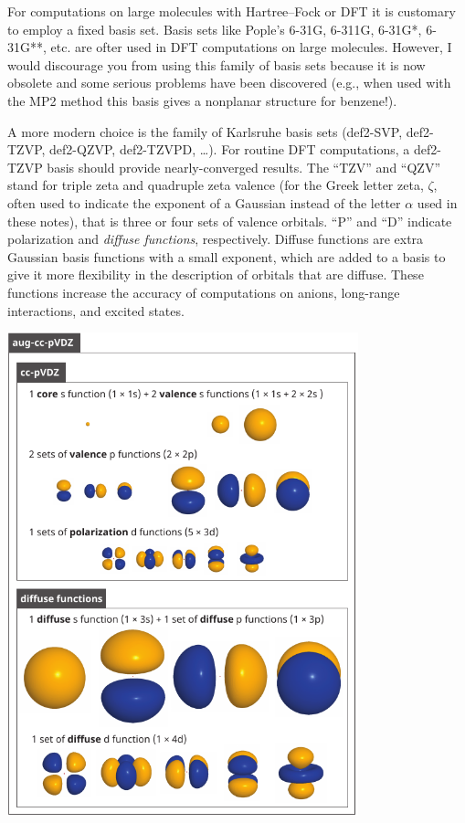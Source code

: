 \documentclass[../Main/chem371-notes.tex]{subfiles}
\begin{document}
For computations on large molecules with Hartree--Fock or DFT it is customary to employ a fixed basis set.
Basis sets like Pople's 6-31G, 6-311G, 6-31G*, 6-31G**, etc. are ofter used in DFT computations on large molecules.
However, I would discourage you from using this family of basis sets because it is now obsolete and some serious problems have been discovered (e.g., when used with the MP2 method this basis gives a nonplanar structure for benzene!).

A more modern choice is the family of Karlsruhe basis sets (def2-SVP, def2-TZVP, def2-QZVP, def2-TZVPD, \ldots). For routine DFT computations, a def2-TZVP basis should provide nearly-converged results.
The ``TZV'' and ``QZV'' stand for triple zeta and quadruple zeta valence (for the Greek letter zeta, $\zeta$, often used to indicate the exponent of a Gaussian instead of the letter $\alpha$ used in these notes), that is three or four sets of valence orbitals.
``P'' and ``D'' indicate polarization and \emph{diffuse functions}, respectively.
Diffuse functions are extra Gaussian basis functions with a small exponent, which are added to a basis to give it more flexibility in the description of orbitals that are diffuse.
These functions increase the accuracy of computations on anions, long-range interactions, and excited states.

{
\includegraphics[width=4.00in]{img/cc-basis.pdf}
\label{fig:basis:cc-basis}
}
\end{document}
